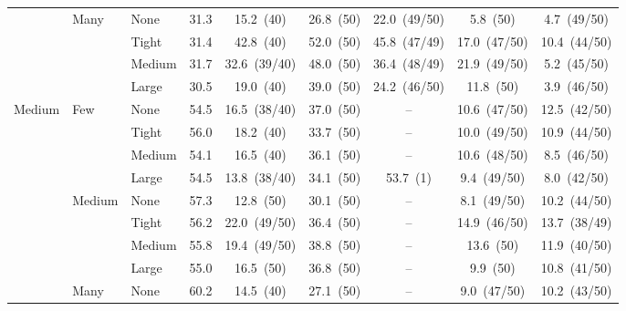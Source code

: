 \begin{table}[htbp]
{\begin{tabular}{lllcccccc}
 & \multirow{4}{*}{\small Many} & {\small None} & 31.3 & 15.2~{\scriptsize(40)} & 26.8~{\scriptsize(50)} & 22.0~{\scriptsize(49/50)} & 5.8~{\scriptsize(50)} & 4.7~{\scriptsize(49/50)} \\
 &  & {\small Tight} & 31.4 & 42.8~{\scriptsize(40)} & 52.0~{\scriptsize(50)} & 45.8~{\scriptsize(47/49)} & 17.0~{\scriptsize(47/50)} & 10.4~{\scriptsize(44/50)} \\
 &  & {\small Medium} & 31.7 & 32.6~{\scriptsize(39/40)} & 48.0~{\scriptsize(50)} & 36.4~{\scriptsize(48/49)} & 21.9~{\scriptsize(49/50)} & 5.2~{\scriptsize(45/50)} \\
 &  & {\small Large} & 30.5 & 19.0~{\scriptsize(40)} & 39.0~{\scriptsize(50)} & 24.2~{\scriptsize(46/50)} & 11.8~{\scriptsize(50)} & 3.9~{\scriptsize(46/50)} \\
\midrule
\multirow{12}{*}{\small Medium} & \multirow{4}{*}{\small Few} & {\small None} & 54.5 & 16.5~{\scriptsize(38/40)} & 37.0~{\scriptsize(50)} & -- & 10.6~{\scriptsize(47/50)} & 12.5~{\scriptsize(42/50)} \\
 &  & {\small Tight} & 56.0 & 18.2~{\scriptsize(40)} & 33.7~{\scriptsize(50)} & -- & 10.0~{\scriptsize(49/50)} & 10.9~{\scriptsize(44/50)} \\
 &  & {\small Medium} & 54.1 & 16.5~{\scriptsize(40)} & 36.1~{\scriptsize(50)} & -- & 10.6~{\scriptsize(48/50)} & 8.5~{\scriptsize(46/50)} \\
 &  & {\small Large} & 54.5 & 13.8~{\scriptsize(38/40)} & 34.1~{\scriptsize(50)} & 53.7~{\scriptsize(1)} & 9.4~{\scriptsize(49/50)} & 8.0~{\scriptsize(42/50)} \\
 & \multirow{4}{*}{\small Medium} & {\small None} & 57.3 & 12.8~{\scriptsize(50)} & 30.1~{\scriptsize(50)} & -- & 8.1~{\scriptsize(49/50)} & 10.2~{\scriptsize(44/50)} \\
 &  & {\small Tight} & 56.2 & 22.0~{\scriptsize(49/50)} & 36.4~{\scriptsize(50)} & -- & 14.9~{\scriptsize(46/50)} & 13.7~{\scriptsize(38/49)} \\
 &  & {\small Medium} & 55.8 & 19.4~{\scriptsize(49/50)} & 38.8~{\scriptsize(50)} & -- & 13.6~{\scriptsize(50)} & 11.9~{\scriptsize(40/50)} \\
 &  & {\small Large} & 55.0 & 16.5~{\scriptsize(50)} & 36.8~{\scriptsize(50)} & -- & 9.9~{\scriptsize(50)} & 10.8~{\scriptsize(41/50)} \\
 & \multirow{4}{*}{\small Many} & {\small None} & 60.2 & 14.5~{\scriptsize(40)} & 27.1~{\scriptsize(50)} & -- & 9.0~{\scriptsize(47/50)} & 10.2~{\scriptsize(43/50)} \\

\end{tabular}}
\end{table}
